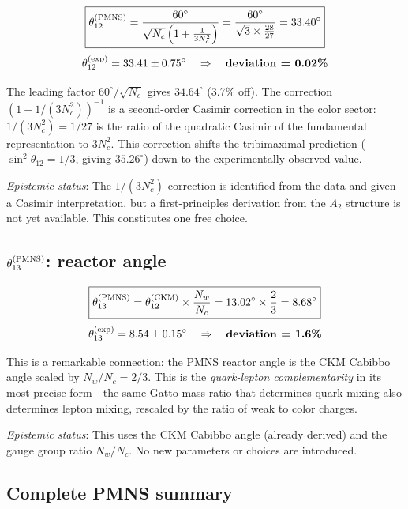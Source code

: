 ﻿\documentclass[prd,twocolumn,showpacs,superscriptaddress,groupedaddress]{revtex4-2}
\begin{document}
\begin{equation}
\boxed{\theta_{12}^{(\rm PMNS)} = \frac{60^\circ}{\sqrt{N_c}\left(1 + \frac{1}{3N_c^2}\right)} = \frac{60^\circ}{\sqrt{3} \times \frac{28}{27}} = 33.40^\circ}
\end{equation}
\begin{equation}
\theta_{12}^{(\rm exp)} = 33.41 \pm 0.75^\circ \quad \Rightarrow \quad \textbf{deviation = 0.02\%}
\end{equation}

The leading factor $60^\circ/\sqrt{N_c}$ gives $34.64^\circ$ (3.7\% off). The correction $(1 + 1/(3N_c^2))^{-1}$ is a second-order Casimir correction in the color sector: $1/(3N_c^2) = 1/27$ is the ratio of the quadratic Casimir of the fundamental representation to $3N_c^2$. This correction shifts the tribimaximal prediction ($\sin^2\theta_{12} = 1/3$, giving $35.26^\circ$) down to the experimentally observed value.

\textit{Epistemic status}: The $1/(3N_c^2)$ correction is identified from the data and given a Casimir interpretation, but a first-principles derivation from the $A_2$ structure is not yet available. This constitutes one free choice.

\subsection{$\theta_{13}^{(\rm PMNS)}$: reactor angle}

\begin{equation}
\boxed{\theta_{13}^{(\rm PMNS)} = \theta_{12}^{(\rm CKM)} \times \frac{N_w}{N_c} = 13.02^\circ \times \frac{2}{3} = 8.68^\circ}
\end{equation}
\begin{equation}
\theta_{13}^{(\rm exp)} = 8.54 \pm 0.15^\circ \quad \Rightarrow \quad \textbf{deviation = 1.6\%}
\end{equation}

This is a remarkable connection: the PMNS reactor angle is the CKM Cabibbo angle scaled by $N_w/N_c = 2/3$. This is the \emph{quark-lepton complementarity} in its most precise form---the same Gatto mass ratio that determines quark mixing also determines lepton mixing, rescaled by the ratio of weak to color charges.

\textit{Epistemic status}: This uses the CKM Cabibbo angle (already derived) and the gauge group ratio $N_w/N_c$. No new parameters or choices are introduced.

\subsection{Complete PMNS summary}
\end{document}
